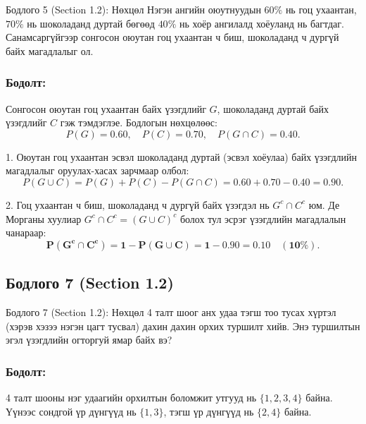 \documentclass[11pt,a4paper]{article}
\begin{document}
\begin{problembox}{Бодлого 5 (Section 1.2): Нөхцөл}
Нэгэн ангийн оюутнуудын $60\%$ нь гоц ухаантан, $70\%$ нь шоколаданд дуртай бөгөөд $40\%$ нь хоёр ангилалд хоёуланд нь багтдаг. Санамсаргүйгээр сонгосон оюутан гоц ухаантан ч биш, шоколаданд ч дургүй байх магадлалыг ол.
\end{problembox}

\subsubsection*{Бодолт:}

Сонгосон оюутан гоц ухаантан байх үзэгдлийг $G$, шоколаданд дуртай байх үзэгдлийг $C$ гэж тэмдэглэе.
Бодлогын нөхцөлөөс:
\[
  P(G) = 0.60, \quad P(C) = 0.70, \quad P(G \cap C) = 0.40.
\]

1. Оюутан гоц ухаантан эсвэл шоколаданд дуртай (эсвэл хоёулаа) байх үзэгдлийн магадлалыг оруулах-хасах зарчмаар олбол:
   \[
     P(G \cup C) = P(G) + P(C) - P(G \cap C) = 0.60 + 0.70 - 0.40 = 0.90.
   \]

2. Гоц ухаантан ч биш, шоколаданд ч дургүй байх үзэгдэл нь $G^c \cap C^c$ юм. Де Морганы хуулиар $G^c \cap C^c = (G \cup C)^c$ болох тул эсрэг үзэгдлийн магадлалын чанараар:
   \[
     \mathbf{P(G^c \cap C^c) = 1 - P(G \cup C) = 1 - 0.90 = 0.10 \quad (10\%)}.
   \]

\vspace{0.8em}

\subsection*{Бодлого 7 (Section 1.2)}

\begin{problembox}{Бодлого 7 (Section 1.2): Нөхцөл}
4 талт шоог анх удаа тэгш тоо тусах хүртэл (хэрэв хэзээ нэгэн цагт тусвал) дахин дахин орхих туршилт хийв. Энэ туршилтын эгэл үзэгдлийн огторгуй ямар байх вэ?
\end{problembox}

\subsubsection*{Бодолт:}

4 талт шооны нэг удаагийн орхилтын боломжит утгууд нь $\{1, 2, 3, 4\}$ байна.
Үүнээс сондгой үр дүнгүүд нь $\{1, 3\}$, тэгш үр дүнгүүд нь $\{2, 4\}$ байна.
\end{document}
